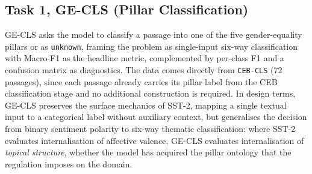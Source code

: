 \documentclass[pdflatex, sn-apa]{sn-jnl}%
\theoremstyle{thmstyleone}%
\theoremstyle{thmstyletwo}%
\theoremstyle{thmstylethree}%
\begin{document}
\subsection{Task 1, GE-CLS (Pillar Classification)}
\label{sec:bench:cls}
GE-CLS asks the model to classify a passage into one of the five gender-equality
pillars or as \texttt{unknown}, framing the problem as single-input six-way
classification with Macro-F1 as the headline metric, complemented by per-class
F1 and a confusion matrix as diagnostics. The data comes directly from
\texttt{CEB-CLS} (72 passages), since each passage already carries its pillar
label from the CEB classification stage and no additional construction is
required. In design terms, GE-CLS preserves the surface mechanics of SST-2,
mapping a single textual input to a categorical label without auxiliary context,
but generalises the decision from binary sentiment polarity to six-way thematic
classification: where SST-2 evaluates internalisation of affective valence,
GE-CLS evaluates internalisation of \emph{topical structure}, whether the model
has acquired the pillar ontology that the regulation imposes on the domain.




\end{document}
